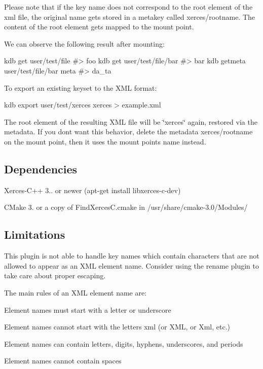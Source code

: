 Please note that if the key name does not correspond to the root element of the xml file, the original name gets stored in a metakey called {\ttfamily xerces/rootname}. The content of the root element gets mapped to the mount point.

We can observe the following result after mounting\+:


\begin{DoxyCode}
kdb get user/test/file
#> foo
kdb get user/test/file/bar
#> bar
kdb getmeta user/test/file/bar meta
#> da\_ta
\end{DoxyCode}


To export an existing keyset to the X\+ML format\+:


\begin{DoxyCode}
kdb export user/test/xerces xerces > example.xml
\end{DoxyCode}


The root element of the resulting X\+ML file will be \char`\"{}xerces\char`\"{} again, restored via the metadata. If you don\textquotesingle{}t want this behavior, delete the metadata {\ttfamily xerces/rootname} on the mount point, then it uses the mount point\textquotesingle{}s name instead.

\subsection*{Dependencies}


\begin{DoxyItemize}
\item {\ttfamily Xerces-\/\+C++ 3..} or newer ({\ttfamily apt-\/get install libxerces-\/c-\/dev})
\item C\+Make 3. or a copy of {\ttfamily Find\+Xerces\+C.\+cmake} in {\ttfamily /usr/share/cmake-\/3.0/\+Modules/}
\end{DoxyItemize}

\subsection*{Limitations}

This plugin is not able to handle key names which contain characters that are not allowed to appear as an X\+ML element name. Consider using the rename plugin to take care about proper escaping.

The main rules of an X\+ML element name are\+:


\begin{DoxyItemize}
\item Element names must start with a letter or underscore
\item Element names cannot start with the letters xml (or X\+ML, or Xml, etc.)
\item Element names can contain letters, digits, hyphens, underscores, and periods
\item Element names cannot contain spaces
\end{DoxyItemize}

